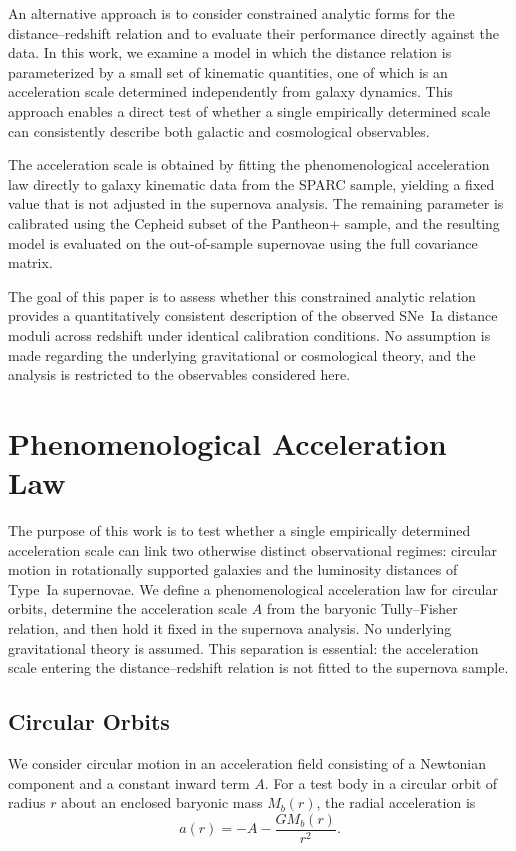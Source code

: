 \documentclass[fleqn,usenatbib]{mnras}
\begin{document}
An alternative approach is to consider constrained analytic forms for the distance--redshift relation and to evaluate their performance directly against the data. In this work, we examine a model in which the distance relation is parameterized by a small set of kinematic quantities, one of which is an acceleration scale determined independently from galaxy dynamics. This approach enables a direct test of whether a single empirically determined scale can consistently describe both galactic and cosmological observables.

The acceleration scale is obtained by fitting the phenomenological acceleration law directly to galaxy kinematic data from the SPARC sample, yielding a fixed value that is not adjusted in the supernova analysis. The remaining parameter is calibrated using the Cepheid subset of the Pantheon+ sample, and the resulting model is evaluated on the out-of-sample supernovae using the full covariance matrix.

The goal of this paper is to assess whether this constrained analytic relation provides a quantitatively consistent description of the observed SNe~Ia distance moduli across redshift under identical calibration conditions. No assumption is made regarding the underlying gravitational or cosmological theory, and the analysis is restricted to the observables considered here.

\section{Phenomenological Acceleration Law}

The purpose of this work is to test whether a single empirically determined acceleration scale can link two otherwise distinct observational regimes: circular motion in rotationally supported galaxies and the luminosity distances of Type~Ia supernovae. We define a phenomenological acceleration law for circular orbits, determine the acceleration scale $A$ from the baryonic Tully--Fisher relation, and then hold it fixed in the supernova analysis. No underlying gravitational theory is assumed. This separation is essential: the acceleration scale entering the distance--redshift relation is not fitted to the supernova sample.

\subsection{Circular Orbits}

We consider circular motion in an acceleration field consisting of a Newtonian component and a constant inward term $A$. For a test body in a circular orbit of radius $r$ about an enclosed baryonic mass $M_b(r)$, the radial acceleration is
\begin{equation}
a(r) = -A - \frac{G M_b(r)}{r^2}.
\end{equation}
\end{document}

